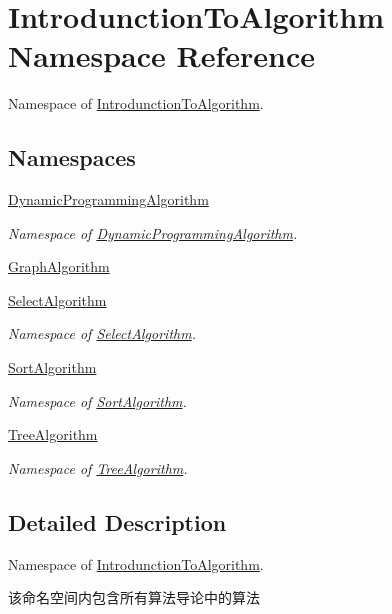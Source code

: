 \hypertarget{namespace_introdunction_to_algorithm}{}\section{Introdunction\+To\+Algorithm Namespace Reference}
\label{namespace_introdunction_to_algorithm}


Namespace of \hyperlink{namespace_introdunction_to_algorithm}{Introdunction\+To\+Algorithm}.  


\subsection*{Namespaces}
\begin{DoxyCompactItemize}
\item 
 \hyperlink{namespace_introdunction_to_algorithm_1_1_dynamic_programming_algorithm}{Dynamic\+Programming\+Algorithm}
\begin{DoxyCompactList}\small\item\em Namespace of \hyperlink{namespace_introdunction_to_algorithm_1_1_dynamic_programming_algorithm}{Dynamic\+Programming\+Algorithm}. \end{DoxyCompactList}\item 
 \hyperlink{namespace_introdunction_to_algorithm_1_1_graph_algorithm}{Graph\+Algorithm}
\item 
 \hyperlink{namespace_introdunction_to_algorithm_1_1_select_algorithm}{Select\+Algorithm}
\begin{DoxyCompactList}\small\item\em Namespace of \hyperlink{namespace_introdunction_to_algorithm_1_1_select_algorithm}{Select\+Algorithm}. \end{DoxyCompactList}\item 
 \hyperlink{namespace_introdunction_to_algorithm_1_1_sort_algorithm}{Sort\+Algorithm}
\begin{DoxyCompactList}\small\item\em Namespace of \hyperlink{namespace_introdunction_to_algorithm_1_1_sort_algorithm}{Sort\+Algorithm}. \end{DoxyCompactList}\item 
 \hyperlink{namespace_introdunction_to_algorithm_1_1_tree_algorithm}{Tree\+Algorithm}
\begin{DoxyCompactList}\small\item\em Namespace of \hyperlink{namespace_introdunction_to_algorithm_1_1_tree_algorithm}{Tree\+Algorithm}. \end{DoxyCompactList}\end{DoxyCompactItemize}


\subsection{Detailed Description}
Namespace of \hyperlink{namespace_introdunction_to_algorithm}{Introdunction\+To\+Algorithm}. 

该命名空间内包含所有算法导论中的算法 